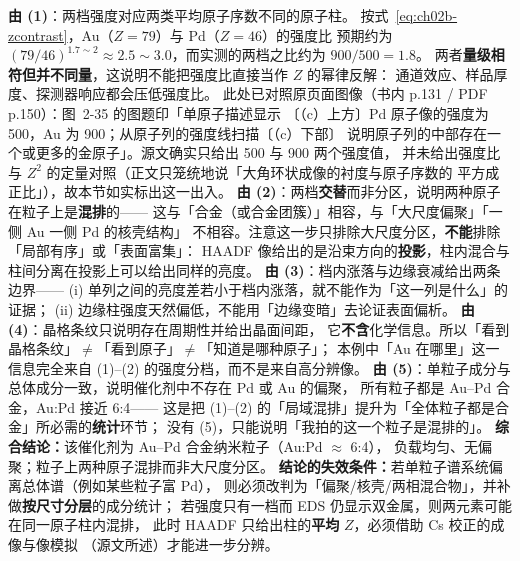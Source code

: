 \begin{infer}
\textbf{由 (1)}：两档强度对应两类平均原子序数不同的原子柱。
按式~\eqref{eq:ch02b-zcontrast}，Au（$Z=79$）与 Pd（$Z=46$）的强度比
预期约为 $(79/46)^{1.7\sim2}\approx2.5\sim3.0$，而实测的两档之比约为 $900/500=1.8$。
两者\textbf{量级相符但并不同量}，这说明不能把强度比直接当作 $Z$ 的幂律反解：
通道效应、样品厚度、探测器响应都会压低强度比。
此处已对照原页面图像（书内 p.131 / PDF p.150）：图~2-35 的图题印「单原子描述显示
〔（c）上方〕Pd 原子像的强度为 500，Au 为 900；从原子列的强度线扫描〔（c）下部〕
说明原子列的中部存在一个或更多的金原子」。源文确实只给出 500 与 900 两个强度值，
并未给出强度比与 $Z^{2}$ 的定量对照（正文只笼统地说「大角环状成像的衬度与原子序数的
平方成正比」），故本节如实标出这一出入。
\textbf{由 (2)}：两档\textbf{交替}而非分区，说明两种原子在粒子上是\textbf{混排}的——
这与「合金（或合金团簇）」相容，与「大尺度偏聚」「一侧 Au 一侧 Pd 的核壳结构」
不相容。注意这一步只排除大尺度分区，\textbf{不能}排除「局部有序」或「表面富集」：
HAADF 像给出的是沿束方向的\textbf{投影}，柱内混合与柱间分离在投影上可以给出同样的亮度。
\textbf{由 (3)}：档内涨落与边缘衰减给出两条边界——
(i) 单列之间的亮度差若小于档内涨落，就不能作为「这一列是什么」的证据；
(ii) 边缘柱强度天然偏低，不能用「边缘变暗」去论证表面偏析。
\textbf{由 (4)}：晶格条纹只说明存在周期性并给出晶面间距，
它\textbf{不含}化学信息。所以「看到晶格条纹」$\neq$「看到原子」$\neq$「知道是哪种原子」；
本例中「Au 在哪里」这一信息完全来自 (1)--(2) 的强度分档，而不是来自高分辨像。
\textbf{由 (5)}：单粒子成分与总体成分一致，说明催化剂中不存在 Pd 或 Au 的偏聚，
所有粒子都是 Au--Pd 合金，Au:Pd 接近 6:4——
这是把 (1)--(2) 的「局域混排」提升为「全体粒子都是合金」所必需的\textbf{统计}环节；
没有 (5)，只能说明「我拍的这一个粒子是混排的」。
\textbf{综合结论：}该催化剂为 Au--Pd 合金纳米粒子（Au:Pd $\approx$ 6:4），
负载均匀、无偏聚；粒子上两种原子混排而非大尺度分区。
\textbf{结论的失效条件：}若单粒子谱系统偏离总体谱（例如某些粒子富 Pd），
则必须改判为「偏聚/核壳/两相混合物」，并补做\textbf{按尺寸分层}的成分统计；
若强度只有一档而 EDS 仍显示双金属，则两元素可能在同一原子柱内混排，
此时 HAADF 只给出柱的\textbf{平均} $Z$，必须借助 Cs 校正的成像与像模拟
（源文所述）才能进一步分辨。
\end{infer}

